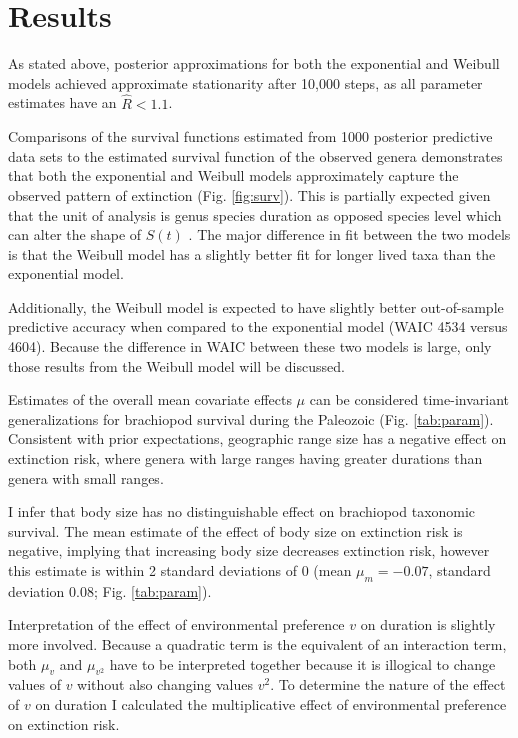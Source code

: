 \documentclass{article}
\begin{document}
\section{Results}

As stated above, posterior approximations for both the exponential and Weibull models achieved approximate stationarity after 10,000 steps, as all parameter estimates have an \(\hat{R} < 1.1\).

Comparisons of the survival functions estimated from 1000 posterior predictive data sets to the estimated survival function of the observed genera demonstrates that both the exponential and Weibull models approximately capture the observed pattern of extinction (Fig. \ref{fig:surv}). This is partially expected given that the unit of analysis is genus species duration as opposed species level which can alter the shape of \(S(t)\) \citep{Raup1975,Raup1978,Raup1985,Foote2001a}. The major difference in fit between the two models is that the Weibull model has a slightly better fit for longer lived taxa than the exponential model.

Additionally, the Weibull model is expected to have slightly better out-of-sample predictive accuracy when compared to the exponential model (WAIC 4534 versus 4604). Because the difference in WAIC between these two models is large, only those results from the Weibull model will be discussed.

Estimates of the overall mean covariate effects \(\mu\) can be considered time-invariant generalizations for brachiopod survival during the Paleozoic (Fig. \ref{tab:param}). Consistent with prior expectations, geographic range size has a negative effect on extinction risk, where genera with large ranges having greater durations than genera with small ranges. 

I infer that body size has no distinguishable effect on brachiopod taxonomic survival. The mean estimate of the effect of body size on extinction risk is negative, implying that increasing body size decreases extinction risk, however this estimate is within 2 standard deviations of 0 (mean \(\mu_{m} = -0.07\), standard deviation 0.08; Fig. \ref{tab:param}). 

Interpretation of the effect of environmental preference \(v\) on duration is slightly more involved. Because a quadratic term is the equivalent of an interaction term, both \(\mu_{v}\) and \(\mu_{v^{2}}\) have to be interpreted together because it is illogical to change values of \(v\) without also changing values \(v^{2}\). To determine the nature of the effect of \(v\) on duration I calculated the multiplicative effect of environmental preference on extinction risk.
\end{document}
